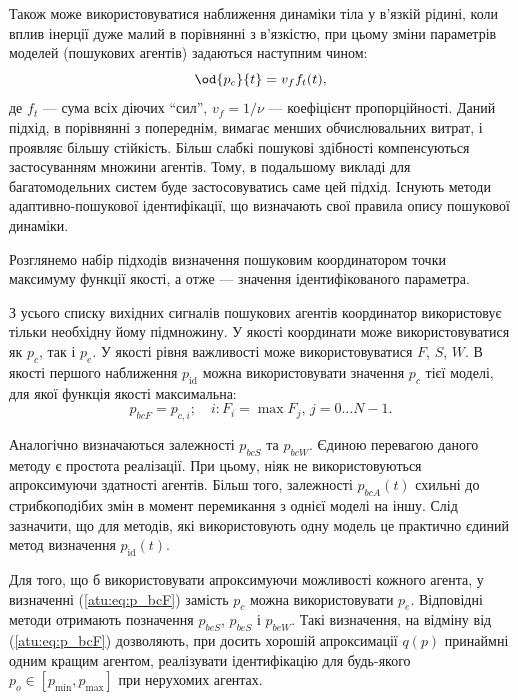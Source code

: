 \documentclass[a4paper,13pt]{atuaref}
\begin{document}
Також може використовуватися наближення динаміки тіла у в'язкій рідині, коли
вплив інерції дуже малий в порівнянні з в'язкістю, при цьому зміни параметрів
моделей (пошукових агентів) задаються наступним чином:
%
\begin{equation}
  \od{p_c}{t} = v_f f_t(t),
  \label{atu:eq:v_f}
\end{equation}
%
\noindent
де $f_t$ --- сума всіх діючих ``сил'',
$v_f = 1 / \nu$ --- коефіцієнт
пропорційності. Даний підхід, в порівнянні з попереднім, вимагає менших
обчислювальних витрат, і проявляє більшу стійкість. Більш слабкі пошукові
здібності компенсуються застосуванням множини агентів. Тому, в подальшому
викладі для багатомодельних систем буде застосовуватись саме цей підхід.
Існують методи адаптивно-пошукової ідентифікації, що визначають свої правила опису пошукової динаміки.


Розглянемо набір підходів визначення пошуковим координатором точки максимуму
функції якості, а отже --- значення ідентифікованого параметра.

З усього списку вихідних сигналів пошукових агентів координатор використовує
тільки необхідну йому підмножину. У якості координати може використовуватися як
$ p_c$, так і $p_e$.
У якості рівня важливості може використовуватися $F$, $S$, $W$.
В якості першого наближення $p_\mathrm{id}$ можна  використовувати
значення $p_c$ тієї моделі, для якої функція якості максимальна:
%
\begin{equation}
  p_{bcF}
  =
  p_{c,i};
  \quad
  i : F_i = \max{F_j}, \, j=0 \ldots N-1 .
  \label{atu:eq:p_bcF}
\end{equation}

Аналогічно визначаються залежності
$p_{bcS}$ та $p_{bcW}$.
Єдиною перевагою даного методу є простота реалізації. При цьому, ніяк не
використовуються апроксимуючи здатності агентів. Більш того, залежності
$p_{bcA} (t)$ схильні до стрибкоподібих змін в момент перемикання з однієї моделі
на іншу. Слід зазначити, що для методів, які використовують одну модель це
практично єдиний метод визначення
$p_\mathrm{id}(t)$.

Для того, що б використовувати апроксимуючи можливості кожного агента, у
визначенні (\ref{atu:eq:p_bcF}) замість $p_c$ можна використовувати $ p_e$.
Відповідні методи отримають позначення $p_{beS}$, $p_{beS} $ і $p_{beW}$.
Такі визначення, на відміну від (\ref{atu:eq:p_bcF}) дозволяють,
при досить хорошій апроксимації $q(p)$ принаймні одним кращим агентом,
реалізувати ідентифікацію для будь-якого
$p_o \in [p_{\min}, p_{\max}]$ при нерухомих агентах.
\end{document}
